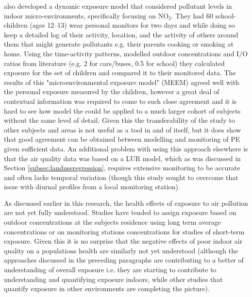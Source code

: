 \cite{Johnson2012} also developed a dynamic exposure model that considered pollutant levels in indoor micro-environments, specifically focusing on NO$_{2}$. They had 60 school-children (ages 12--13) wear personal monitors for two days and while doing so keep a detailed log of their activity, location, and the activity of others around them that might generate pollutants e.g. their parents cooking or smoking at home. Using the time-activity patterns, modelled outdoor concentrations and I/O ratios from literature (e.g. 2 for cars/buses, 0.5 for school) they calculated exposure for the set of children and compared it to their monitored data. The results of this "microenvironmental exposure model" (MEEM) agreed well with the personal exposure measured by the children, however a great deal of contextual information was required to come to such close agreement and it is hard to see how model the could be applied to a much larger cohort of subjects without the same level of detail. Given this the transferability of the study to other subjects and areas is not useful as a tool in and of itself, but it does show that good agreement can be obtained between modelling and monitoring of PE given sufficient data. An additional problem with using this approach elsewhere is that the air quality data was based on a LUR model, which as was discussed in Section \ref{subsec:landuseregression}, requires extensive monitoring to be accurate and often lacks temporal variation (though this study sought to overcome that issue with diurnal profiles from a local monitoring station).

As discussed earlier in this research, the health effects of exposure to air pollution are not yet fully understood. Studies have tended to assign exposure based on outdoor concentrations at the subjects residence using long term average concentrations or on monitoring stations concentrations for studies of short-term exposure. Given this it is no surprise that the negative effects of poor indoor air quality on a populations health are similarly not yet understood (although the approaches discussed in the preceding paragraphs are contributing to a better of understanding of overall exposure i.e. they are starting to contribute to understanding and quantifying exposure indoors, while other studies that quantify exposure in other environments are completing the picture).

